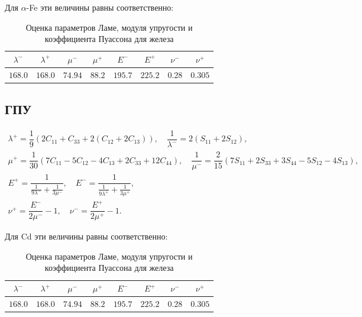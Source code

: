 \documentclass[12pt,a4paper]{article}
\begin{document}
 \pagebreak

 Для $\alpha$-Fe эти величины равны соответственно:
 \begin{table}[h!]
    \centering
    \begin{tabular}{|c|c|c|c|c|c|c|c|}
        \hline 
        $\lambda^-$ & $\lambda^+$ & $\mu^-$ & $\mu^+$ & $E^-$ & $E^+$ & $\nu^-$ & $\nu^+$ \\
        \hline 
        $168.0$ & $168.0$ & $74.94$ & $88.2$ & $195.7$ & $225.2$ & $0.28$ & $0.305$ \\
        \hline
    \end{tabular}
    \vspace{3mm}
    \caption{Оценка параметров Ламе, модуля упругости и коэффициента Пуассона для железа}
 \end{table}

 \subsection{ГПУ}
 \begin{gather*}
    \lambda^+ = \dfrac{1}{9}(2C_{11} + C_{33} + 2(C_{12} + 2C_{13})), \quad \dfrac{1}{\lambda^-} = 2(S_{11} + 2S_{12}),
    \\[0.7em]
    \mu^+ = \dfrac{1}{30}(7C_{11} - 5C_{12} - 4C_{13} + 2C_{33} + 12C_{44}), \quad \dfrac{1}{\mu^-} = \dfrac{2}{15}(7S_{11} + 2S_{33} + 3S_{44} - 5S_{12} - 4S_{13}),
    \\[0.7em]
    E^+ = \dfrac{1}{\tfrac{1}{9 \lambda^-} + \tfrac{1}{3\mu^-}}, \quad E^- = \dfrac{1}{\tfrac{1}{9 \lambda^+} + \tfrac{1}{3\mu^+}},
    \\[0.7em]
    \nu^+ = \dfrac{E^-}{2\mu^-} - 1, \quad \nu^- = \dfrac{E^+}{2\mu^+} - 1.
 \end{gather*}

 Для Cd эти величины равны соответственно: 
 \begin{table}[h!]
    \centering
    \begin{tabular}{|c|c|c|c|c|c|c|c|}
        \hline 
        $\lambda^-$ & $\lambda^+$ & $\mu^-$ & $\mu^+$ & $E^-$ & $E^+$ & $\nu^-$ & $\nu^+$ \\
        \hline 
        $168.0$ & $168.0$ & $74.94$ & $88.2$ & $195.7$ & $225.2$ & $0.28$ & $0.305$ \\
        \hline
    \end{tabular}
    \vspace{3mm}
    \caption{Оценка параметров Ламе, модуля упругости и коэффициента Пуассона для железа}
 \end{table}
\end{document}
